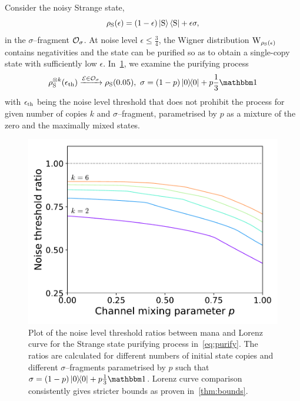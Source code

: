 \documentclass[pra,
aps,
twocolumn,
superscriptaddress,
groupedaddress,
nofootinbib,
reprint
]{revtex4-1}
\begin{document}
Consider the noisy Strange state,
\begin{equation}
    \rho_{\rm{S}}(\epsilon) = (1 - \epsilon) \ket{\rm{S}}\bra{\rm{S}} + \epsilon \sigma,
\end{equation}
in the $\sigma$--fragment $\mathcal{O}_\sigma$.
At noise level $\epsilon \leq \frac{3}{4}$, the Wigner distribution $\W{\rho_{\rm{S}}(\epsilon)}$ contains negativities and the state can be purified so as to obtain a single-copy state with sufficiently low $\epsilon$.
In~\cref{fig:distill}, we examine the purifying process 
\begin{equation}\label{eq:purify}
    \rho_{\rm{S}}^{\otimes k}(\epsilon_{\rm{th}}) \xrightarrow{\E \in \O_\sigma} \rho_{\rm{S}}(0.05),\ \sigma = (1-p)\ketbra{0} + p \frac{1}{3}\id
\end{equation}
with $\epsilon_{\rm{th}}$ being the noise level threshold that does not prohibit the process for given number of copies $k$ and $\sigma$--fragment, parametrised by $p$ as a mixture of the zero and the maximally mixed states.
\begin{figure}
    \centering
    \includegraphics[scale=0.5]{figs/ratios.pdf}
    \caption{Plot of the noise level threshold ratios between mana and Lorenz curve for the Strange state purifying process in~\cref{eq:purify}.
    The ratios are calculated for different numbers of initial state copies and different $\sigma$--fragments parametrised by $p$ such that $\sigma = (1-p)\ketbra{0} + p \frac{1}{3}\id$.
    Lorenz curve comparison consistently gives stricter bounds as proven in~\cref{thm:bounds}.
    }
    \label{fig:distill}
\end{figure}
\end{document}
